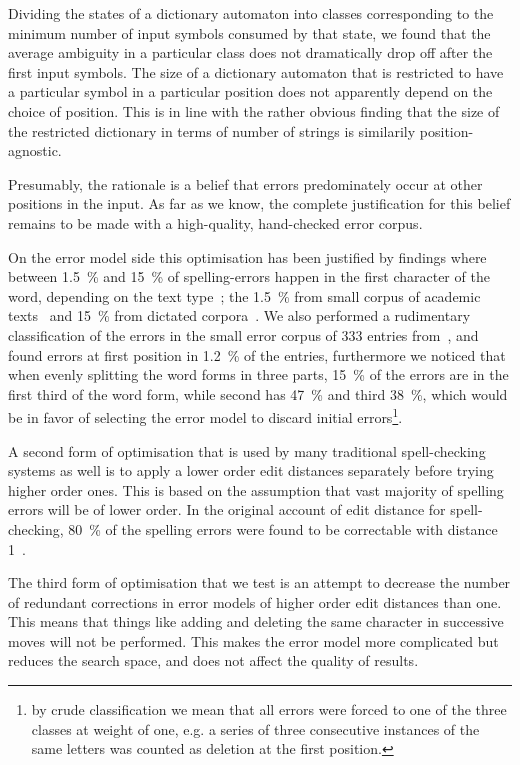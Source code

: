 \documentclass[11pt]{article}
\begin{document}
Dividing the states of a dictionary automaton into classes corresponding to
the minimum number of input symbols consumed by that state, we found that
the average ambiguity in a particular class does not dramatically drop off after
the first input symbols.
The size of a dictionary automaton that is restricted to have
a particular symbol in a particular position does not apparently depend on the
choice of position. This is in line with the rather obvious finding that the
size of the restricted dictionary in terms of number of strings is similarily
position-agnostic.

Presumably, the rationale is a belief that errors predominately occur at other
positions in the input. As far as we know, the complete justification for this
belief remains to be made with a high-quality, hand-checked error corpus.

On the error model side this optimisation has been justified by findings where
between 1.5~\% and 15~\% of spelling-errors happen in the first character of
the word, depending on the text type~\cite{Bhagat/2007};
the 1.5~\% from small corpus of academic texts~\cite{Yannakoudakis/1983}
and 15~\% from dictated corpora~\cite{Kukich/1992}. We also performed a
rudimentary classification of the errors in the small error corpus of
333 entries from~, and found errors at
first position in 1.2~\% of the entries, furthermore we noticed that
when evenly splitting the word forms in three parts, 15~\% of the errors are
in the first third of the word form, while second has 47~\% and third 38~\%,
which would be in favor of selecting the error model to discard initial
errors\footnote{by crude classification we mean that all errors were
forced to one of the three classes at weight of one, e.g. a series of
three consecutive instances of the same letters was counted as deletion at
the first position.}.

A second form of optimisation that is used by many traditional spell-checking
systems as well is to apply a lower order edit distances separately before
trying higher order ones. This is based on the assumption that vast majority
of spelling errors will be of lower order. In the original
account of edit distance for spell-checking, 80~\% of the spelling
errors were found to be correctable with distance 1~\cite{Pollock/1984}.

The third form of optimisation that we test is an attempt to decrease the
number of redundant corrections in error models of higher order edit distances
than one. This means that things like  adding and deleting the
same character in successive moves will not be performed. This makes the error
model more complicated but reduces the search space, and does not affect the
quality of results.
\end{document}
